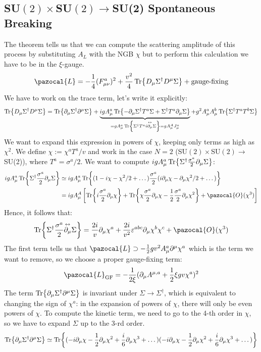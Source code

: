 \documentclass[../main.tex]{subfiles}
\begin{document}
\subsection{SU$(2)\times$SU$(2)\to$SU(2) Spontaneous Breaking}
The theorem tells us that we can compute the scattering amplitude of this process by substituting $A_L$ with the NGB $\chi$ but to perform this calculation we have to be in the $\xi$-gauge. 
\[
\pazocal{L}=-\frac{1}{4}(F_{\mu\nu}^a)^2+\frac{v^2}{4}\Tr{D_\mu\Sigma^\dagger D^\mu\Sigma}+\text{gauge-fixing}
\]
We have to work on the trace term, let's write it explicitly:
\[
\Tr{D_\mu\Sigma^\dagger D^\mu\Sigma}=\Tr{\partial_\mu\Sigma^\dagger\partial^\mu\Sigma}+\underbrace{igA_\mu^a\Tr{-\partial_\mu\Sigma^\dagger T^a\Sigma+\Sigma^\dagger T^a\partial_\mu\Sigma}}_{=gA_\mu^a\Tr{\Sigma^\dagger T^ai\overset{\leftrightarrow}{\partial_\mu}\Sigma}=gA_\mu^AJ_\mu^a}+g^2A_\mu^aA_\mu^b\Tr{\Sigma^\dagger T^aT^b\Sigma}
\]
We want to expand this expression in powers of $\chi$, keeping only terms as high as $\chi^2$. We define $\chi:=\chi^aT^a/v$ and work in the case $N=2$ (SU$(2)\times$SU$(2)\to$SU(2)), where $T^a=\sigma^a/2$. We want to compute $igA_\mu^a\Tr{\Sigma^\dagger\frac{\sigma^a}{2}\partial_\mu\Sigma}$:
\begin{align*}
igA_\mu^a\Tr{\Sigma^\dagger\frac{\sigma^a}{2}\partial_\mu\Sigma}&\simeq igA_\mu^a\Tr{(1-i\chi-\chi^2/2+\dots)\frac{\sigma^a}{2}(i\partial_\mu\chi-\partial_\mu\chi^2/2+\dots)}\\
&=igA_\mu^A\left[\Tr{i\frac{\sigma^a}{2}\partial_\mu\chi}+\Tr{\chi\frac{\sigma^a}{2}\partial_\mu\chi-\frac{1}{2}\frac{\sigma^a}{2}\partial_\mu\chi^2}+\pazocal{O}(\chi^3)\right]
\end{align*}
Hence, it follows that:
\[
\Tr{\Sigma^\dagger\frac{\sigma^a}{2}\overset{\leftrightarrow}{\partial_\mu}\Sigma}=\frac{2i}{v}\partial_\mu\chi^a+\frac{2i}{v^2}\varepsilon^{abc}\partial_\mu\chi^b\chi^c+\pazocal{O}(\chi^3)
\]
The first term tells us that $\pazocal{L}\supset-\frac{1}{2}gv^2A_\mu^a\partial^\mu\chi^a$ which is the term we want to remove, so we choose a proper gauge-fixing term:
\[
\pazocal{L}_{\text{GF}}=-\frac{1}{2\xi}(\partial_\mu A^{\mu,a}+\frac{1}{2}\xi gv\chi^a)^2
\]
The term $\Tr{\partial_\mu\Sigma^\dagger\partial^\mu\Sigma}$ is invariant under $\Sigma\to\Sigma^\dagger$, which is equivalent to changing the sign of $\chi^a$: in the expansion of powers of $\chi$, there will only be even powers of $\chi$. To compute the kinetic term, we need to go to the 4-th order in $\chi$, so we have to expand $\Sigma$ up to the 3-rd order.
\[
\Tr{\partial_\mu\Sigma^\dagger\partial^\mu\Sigma}\simeq\Tr{(-i\partial_\mu\chi-\frac{1}{2}\partial_\mu\chi^2+\frac{i}{6}\partial_\mu\chi^3+\dots)(-i\partial_\mu\chi-\frac{1}{2}\partial_\mu\chi^2+\frac{i}{6}\partial_\mu\chi^3+\dots)}
\]
\end{document}
